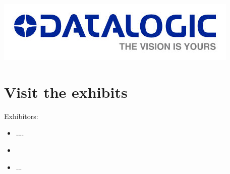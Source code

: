 \includegraphics[scale=0.9]{images/logo_DATALOGIC}\\
\section*{Visit the exhibits}
Exhibitors:
\begin{itemize}
\item ....
\item
\item ...
\end{itemize}


